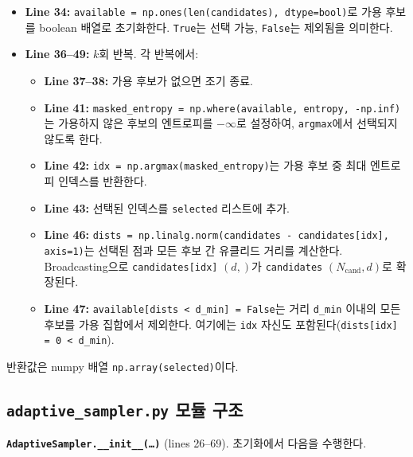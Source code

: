 \documentclass[11pt]{article}
\begin{document}
\begin{itemize}
  \item \textbf{Line 34:} \texttt{available = np.ones(len(candidates), dtype=bool)}로 가용 후보를 boolean 배열로 초기화한다. \texttt{True}는 선택 가능, \texttt{False}는 제외됨을 의미한다.
  \item \textbf{Line 36--49:} $k$회 반복. 각 반복에서:
  \begin{itemize}
    \item \textbf{Line 37--38:} 가용 후보가 없으면 조기 종료.
    \item \textbf{Line 41:} \texttt{masked\_entropy = np.where(available, entropy, -np.inf)}는 가용하지 않은 후보의 엔트로피를 $-\infty$로 설정하여, \texttt{argmax}에서 선택되지 않도록 한다.
    \item \textbf{Line 42:} \texttt{idx = np.argmax(masked\_entropy)}는 가용 후보 중 최대 엔트로피 인덱스를 반환한다.
    \item \textbf{Line 43:} 선택된 인덱스를 \texttt{selected} 리스트에 추가.
    \item \textbf{Line 46:} \texttt{dists = np.linalg.norm(candidates - candidates[idx], axis=1)}는 선택된 점과 모든 후보 간 유클리드 거리를 계산한다. Broadcasting으로 \texttt{candidates[idx]} $(d,)$가 \texttt{candidates} $(N_{\text{cand}}, d)$로 확장된다.
    \item \textbf{Line 47:} \texttt{available[dists < d\_min] = False}는 거리 \texttt{d\_min} 이내의 모든 후보를 가용 집합에서 제외한다. 여기에는 \texttt{idx} 자신도 포함된다(\texttt{dists[idx] = 0 < d\_min}).
  \end{itemize}
\end{itemize}

반환값은 numpy 배열 \texttt{np.array(selected)}이다.


\subsection{\texttt{adaptive\_sampler.py} 모듈 구조}

\textbf{\texttt{AdaptiveSampler.\_\_init\_\_(\dots)}} (lines 26--69). 초기화에서 다음을 수행한다.
\end{document}
